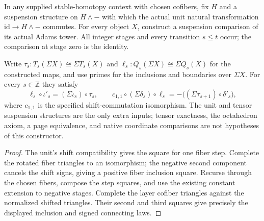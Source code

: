\begin{proposition}
  \label{prop:adams-suspension-construction}
  \leanok
  In any supplied stable-homotopy context with chosen cofibers, fix $H$
  and a suspension structure on $H\wedge-$ with which the actual unit
  natural transformation $\mathrm{id}\to H\wedge-$ commutes.
  For every object $X$, construct a suspension comparison of its actual
  Adams tower. All integer stages and every transition $s\le t$ occur;
  the comparison at stage zero is the identity.

  Write $\tau_s:T_s(\Sigma X)\cong\Sigma T_s(X)$ and
  $\ell_s:Q_s(\Sigma X)\cong\Sigma Q_s(X)$ for the constructed maps,
  and use primes for the inclusions and boundaries over $\Sigma X$.
  For every $s\in\mathbb Z$ they satisfy
  \[
    \ell_s\circ\iota'_s=(\Sigma\iota_s)\circ\tau_s,
    \qquad
    c_{1,1}\circ(\Sigma\delta_s)\circ\ell_s
      =-\bigl((\Sigma\tau_{s+1})\circ\delta'_s\bigr),
  \]
  where $c_{1,1}$ is the specified shift-commutation isomorphism.
  The unit and tensor suspension structures are the only extra inputs;
  tensor exactness, the octahedron axiom, a page equivalence, and native
  coordinate comparisons are not hypotheses of this constructor.
\end{proposition}
\begin{proof}
  \leanok
  The unit's shift compatibility gives the square for one fiber step.
  Complete the rotated fiber triangles to an isomorphism; the negative
  second component cancels the shift signs, giving a positive fiber
  inclusion square. Recurse through the chosen fibers, compose the step
  squares, and use the existing constant extension to negative stages.
  Complete the layer cofiber triangles against the normalized shifted
  triangles. Their second and third squares give precisely the displayed
  inclusion and signed connecting laws.
\end{proof}

